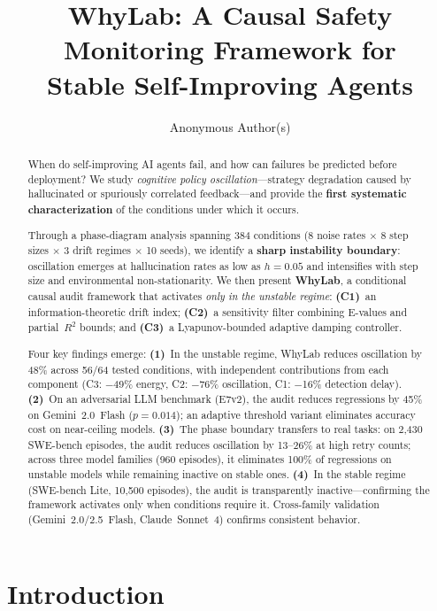 \documentclass{article}
\title{WhyLab: A Causal Safety Monitoring Framework for\\
Stable Self-Improving Agents}
\author{
  Anonymous Author(s)
}
\begin{document}
\maketitle

\begin{abstract}
When do self-improving AI agents fail, and how can failures be predicted before deployment?
We study \emph{cognitive policy oscillation}---strategy degradation caused by hallucinated or spuriously correlated feedback---and provide the \textbf{first systematic characterization} of the conditions under which it occurs.

Through a phase-diagram analysis spanning 384 conditions (8 noise rates $\times$ 8 step sizes $\times$ 3 drift regimes $\times$ 10 seeds), we identify a \textbf{sharp instability boundary}: oscillation emerges at hallucination rates as low as $h{=}0.05$ and intensifies with step size and environmental non-stationarity.
We then present \textbf{WhyLab}, a conditional causal audit framework that activates \emph{only in the unstable regime}:
\textbf{(C1)}~an information-theoretic drift index;
\textbf{(C2)}~a sensitivity filter combining E-values and partial~$R^2$ bounds; and
\textbf{(C3)}~a Lyapunov-bounded adaptive damping controller.

Four key findings emerge:
\textbf{(1)}~In the unstable regime, WhyLab reduces oscillation by 48\% across 56/64 tested conditions, with independent contributions from each component (C3: $-$49\% energy, C2: $-$76\% oscillation, C1: $-$16\% detection delay).
\textbf{(2)}~On an adversarial LLM benchmark (E7v2), the audit reduces regressions by 45\% on Gemini~2.0~Flash ($p{=}0.014$); an adaptive threshold variant eliminates accuracy cost on near-ceiling models.
\textbf{(3)}~The phase boundary transfers to real tasks: on 2{,}430 SWE-bench episodes, the audit reduces oscillation by 13--26\% at high retry counts; across three model families (960 episodes), it eliminates 100\% of regressions on unstable models while remaining inactive on stable ones.
\textbf{(4)}~In the stable regime (SWE-bench Lite, 10{,}500 episodes), the audit is transparently inactive---confirming the framework activates only when conditions require it.
Cross-family validation (Gemini~2.0/2.5~Flash, Claude~Sonnet~4) confirms consistent behavior.
\end{abstract}


\section{Introduction}
\label{sec:intro}
\end{document}
